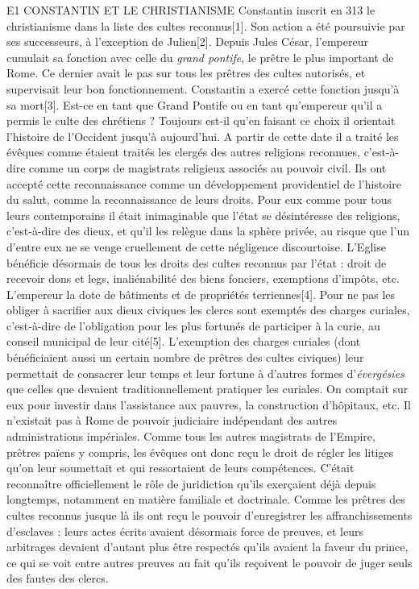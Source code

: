E1 CONSTANTIN ET LE CHRISTIANISME
 Constantin inscrit en 313 le christianisme dans la liste des cultes reconnus[1]. Son action a été poursuivie par ses successeurs, à l'exception de Julien[2]. Depuis Jules César, l'empereur cumulait sa fonction avec celle du \emph{grand pontife}, le prêtre le plus important de Rome. Ce dernier avait le pas sur tous les prêtres des cultes autorisés, et supervisait leur bon fonctionnement. Constantin a exercé cette fonction jusqu'à sa mort[3]. Est-ce en tant que Grand Pontife ou en tant qu'empereur qu'il a permis le culte des chrétiens ? Toujours est-il qu'en faisant ce choix il orientait l'histoire de l'Occident jusqu'à aujourd'hui.
 A partir de cette date il a traité les évêques comme étaient traités les clergés des autres religions reconnues, c'est-à-dire comme un corps de magistrats religieux associés au pouvoir civil. Ils ont accepté cette reconnaissance comme un développement providentiel de l'histoire du salut, comme la reconnaissance de leurs droits. Pour eux comme pour tous leurs contemporains il était inimaginable que l'état se désintéresse des religions, c'est-à-dire des dieux, et qu'il les relègue dans la sphère privée, au risque que l'un d'entre eux ne se venge cruellement de cette négligence discourtoise. 
 L'Eglise bénéficie désormais de tous les droits des cultes reconnus par l'état : droit de recevoir dons et legs, inaliénabilité des biens fonciers, exemptions d'impôts, etc. L'empereur la dote de bâtiments et de propriétés terriennes[4]. Pour ne pas les obliger à sacrifier aux dieux civiques les clercs sont exemptés des charges curiales, c'est-à-dire de l'obligation pour les plus fortunés de participer à la curie, au conseil municipal de leur cité[5]. L'exemption des charges curiales (dont bénéficiaient aussi un certain nombre de prêtres des cultes civiques) leur permettait de consacrer leur temps et leur fortune à d'autres formes d'\emph{évergésies} que celles que devaient traditionnellement pratiquer les curiales. On comptait sur eux pour investir dans l'assistance aux pauvres, la construction d'hôpitaux, etc. 
 Il n'existait pas à Rome de pouvoir judiciaire indépendant des autres administrations impériales. Comme tous les autres magistrats de l'Empire, prêtres païens y compris, les évêques ont donc reçu le droit de régler les litiges qu'on leur soumettait et qui ressortaient de leurs compétences. C'était reconnaître officiellement le rôle de juridiction qu'ils exerçaient déjà depuis longtemps, notamment en matière familiale et doctrinale. Comme les prêtres des cultes reconnus jusque là ils ont reçu le pouvoir d'enregistrer les affranchissements d'esclaves : leurs actes écrits avaient désormais force de preuves, et leurs arbitrages devaient d'autant plus être respectés qu'ils avaient la faveur du prince, ce qui se voit entre autres preuves au fait qu'ils reçoivent le pouvoir de juger seuls des fautes des clercs.
